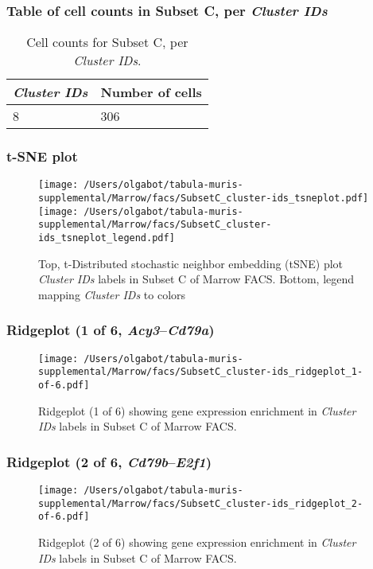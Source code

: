 \subsubsection{Table of cell counts in Subset C, per \emph{Cluster IDs}}\begin{table}[h]
\centering
\label{my-label}
\begin{tabular}{@{}ll@{}}
\toprule

\emph{Cluster IDs}& Number of cells \\ \midrule
8 & 306 \\
\bottomrule
\end{tabular}
\caption{Cell counts for Subset C, per \emph{Cluster IDs}.}
\end{table}

\clearpage
\subsubsection{t-SNE plot}
\begin{figure}[h]
\centering
\texttt{[image: /Users/olgabot/tabula-muris-supplemental/Marrow/facs/SubsetC\_cluster-ids\_tsneplot.pdf]}
\texttt{[image: /Users/olgabot/tabula-muris-supplemental/Marrow/facs/SubsetC\_cluster-ids\_tsneplot\_legend.pdf]}
\caption{Top, t-Distributed stochastic neighbor embedding (tSNE) plot  \emph{Cluster IDs} labels in Subset C of Marrow FACS. Bottom, legend mapping \emph{Cluster IDs} to colors}
\end{figure}


\clearpage

\subsubsection{Ridgeplot (1 of 6, \emph{Acy3}--\emph{Cd79a})}
\begin{figure}[h]
\centering
\texttt{[image: /Users/olgabot/tabula-muris-supplemental/Marrow/facs/SubsetC\_cluster-ids\_ridgeplot\_1-of-6.pdf]}

\caption{ Ridgeplot (1 of 6)  showing gene expression enrichment in \emph{Cluster IDs} labels in Subset C of Marrow FACS. }
\end{figure}


\clearpage

\subsubsection{Ridgeplot (2 of 6, \emph{Cd79b}--\emph{E2f1})}
\begin{figure}[h]
\centering
\texttt{[image: /Users/olgabot/tabula-muris-supplemental/Marrow/facs/SubsetC\_cluster-ids\_ridgeplot\_2-of-6.pdf]}

\caption{ Ridgeplot (2 of 6)  showing gene expression enrichment in \emph{Cluster IDs} labels in Subset C of Marrow FACS. }
\end{figure}


